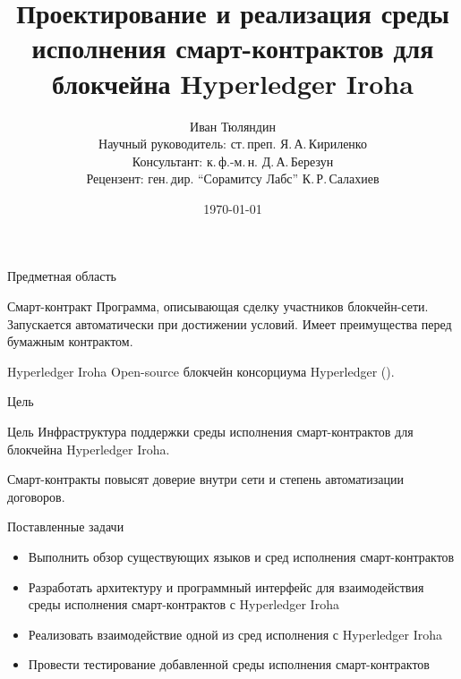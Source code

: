 \documentclass[hyperref={pdfpagelabels=false}]{beamer}
\begin{document}
  
\title[Смарт-контракты для Hyperledger Iroha]{Проектирование и реализация среды исполнения смарт-контрактов для блокчейна Hyperledger Iroha}  
\author[И. Тюляндин]{Иван Тюляндин\\%
Научный руководитель: ст.\,преп. Я.\,А.\,Кириленко\\%
Консультант: к.\,ф.-м.\,н. Д.\,А.\,Березун\\%
Рецензент: ген.\,дир. “Сорамитсу Лабс” К.\,Р.\,Салахиев%
} 
\date{\today} 
{
}

\begin{frame}{Предметная область}
\begin{block}{Смарт-контракт} 
Программа, описывающая сделку участников блокчейн-сети. Запускается автоматически при достижении условий. 
Имеет преимущества перед бумажным контрактом.
\end{block}
\vfill
\begin{block}{Hyperledger Iroha}
Open-source блокчейн консорциума Hyperledger ({\color{blue}{https://github.com/hyperledger/iroha}}).
\end{block}
\end{frame} 

\begin{frame}{Цель}
\begin{block}{Цель}
Инфраструктура поддержки среды исполнения смарт-контрактов для блокчейна Hyperledger Iroha.
\end{block}
\vfill
Смарт-контракты повысят доверие внутри сети и степень автоматизации договоров.
\end{frame} 

\begin{frame}{Поставленные задачи}
\begin{itemize}
\item Выполнить обзор существующих языков и сред исполнения смарт-контрактов
\vfill
\item Разработать архитектуру и программный интерфейс для взаимодействия среды исполнения смарт-контрактов с Hyperledger Iroha
\vfill
\item Реализовать взаимодействие одной из сред исполнения с Hyperledger Iroha
\vfill
\item Провести тестирование добавленной среды исполнения смарт-контрактов
\end{itemize}

\end{frame} 
\end{document}
